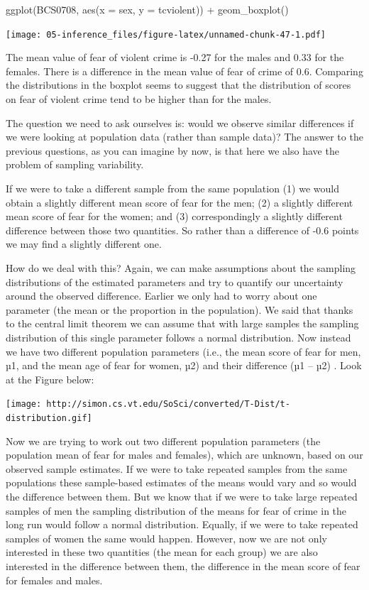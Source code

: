 \documentclass[
]{book}
\newenvironment{Shaded}{\begin{snugshade}}{\end{snugshade}}
\newcommand{\AttributeTok}[1]{\textcolor[rgb]{0.77,0.63,0.00}{#1}}
\newcommand{\FunctionTok}[1]{\textcolor[rgb]{0.00,0.00,0.00}{#1}}
\newcommand{\NormalTok}[1]{#1}
\newcommand{\SpecialCharTok}[1]{\textcolor[rgb]{0.00,0.00,0.00}{#1}}
\begin{document}
\begin{Shaded}
\begin{Highlighting}[]
\FunctionTok{ggplot}\NormalTok{(BCS0708, }\FunctionTok{aes}\NormalTok{(}\AttributeTok{x =}\NormalTok{ sex, }\AttributeTok{y =}\NormalTok{ tcviolent)) }\SpecialCharTok{+}
  \FunctionTok{geom\_boxplot}\NormalTok{()}
\end{Highlighting}
\end{Shaded}

\texttt{[image: 05-inference\_files/figure-latex/unnamed-chunk-47-1.pdf]}

The mean value of fear of violent crime is -0.27 for the males and 0.33 for the females. There is a difference in the mean value of fear of crime of 0.6. Comparing the distributions in the boxplot seems to suggest that the distribution of scores on fear of violent crime tend to be higher than for the males.

The question we need to ask ourselves is: would we observe similar differences if we were looking at population data (rather than sample data)? The answer to the previous questions, as you can imagine by now, is that here we also have the problem of sampling variability.

If we were to take a different sample from the same population (1) we would obtain a slightly different mean score of fear for the men; (2) a slightly different mean score of fear for the women; and (3) correspondingly a slightly different difference between those two quantities. So rather than a difference of -0.6 points we may find a slightly different one.

How do we deal with this? Again, we can make assumptions about the sampling distributions of the estimated parameters and try to quantify our uncertainty around the observed difference. Earlier we only had to worry about one parameter (the mean or the proportion in the population). We said that thanks to the central limit theorem we can assume that with large samples the sampling distribution of this single parameter follows a normal distribution. Now instead we have two different population parameters (i.e., the mean score of fear for men, µ1, and the mean age of fear for women, µ2) and their difference (µ1 -- µ2) . Look at the Figure below:

\texttt{[image: http://simon.cs.vt.edu/SoSci/converted/T-Dist/t-distribution.gif]}

Now we are trying to work out two different population parameters (the population mean of fear for males and females), which are unknown, based on our observed sample estimates. If we were to take repeated samples from the same populations these sample-based estimates of the means would vary and so would the difference between them. But we know that if we were to take large repeated samples of men the sampling distribution of the means for fear of crime in the long run would follow a normal distribution. Equally, if we were to take repeated samples of women the same would happen. However, now we are not only interested in these two quantities (the mean for each group) we are also interested in the difference between them, the difference in the mean score of fear for females and males.
\end{document}

